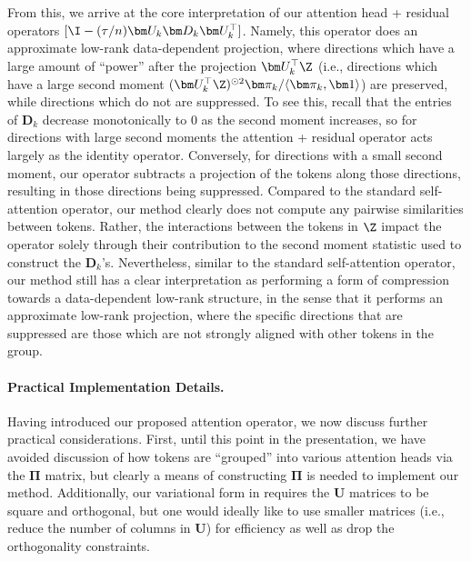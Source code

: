 \documentclass[../../book-main.tex]{subfiles}
\begin{document}
From this, we arrive at the core interpretation of our attention head + residual operators $[\I - (\tau/n)\bm U_{k}\bm D_{k}\bm U_{k}^{\top}]$.  Namely, this operator does an approximate low-rank data-dependent projection, where directions which have a large amount of ``power'' after the projection $\bm U_k^\top \Z$ (i.e., directions which have a large second moment $(\bm U_{k}^{\top}\Z)^{\odot 2}\bm \pi_k / \langle \bm \pi_{k}, \bm 1\rangle$) are preserved, while directions which do not are suppressed. To see this, recall that the entries of $\bm D_k$ decrease monotonically to 0 as the second moment increases, so for directions with large second moments the attention + residual operator acts largely as the identity operator.  Conversely, for directions with a small second moment, our operator subtracts a projection of the tokens along those directions, resulting in those directions being suppressed. Compared to the standard self-attention operator, our method clearly does not compute any pairwise similarities between tokens. Rather, the interactions between the tokens in $\Z$ impact the operator solely through their contribution to the second moment statistic used to construct the $\bm D_{k}$'s.  Nevertheless, similar to the standard self-attention operator, our method still has a clear interpretation as performing a form of compression towards a data-dependent low-rank structure, in the sense that it performs an approximate low-rank projection, where the specific directions that are suppressed are those which are not strongly aligned with other tokens in the group.

\paragraph{Practical Implementation Details.} Having introduced our proposed attention operator, we now discuss further practical considerations.  First, until this point in the presentation, we have avoided discussion of how tokens are ``grouped'' into various attention heads via the $\bm\Pi$ matrix, but clearly a means of constructing $\bm\Pi$ is needed to implement our method.  Additionally, our variational form in  requires the $\bm U$ matrices to be square and orthogonal, but one would ideally like to use smaller matrices (i.e., reduce the number of columns in $\bm U$) for efficiency as well as drop the orthogonality constraints. 
\end{document}
